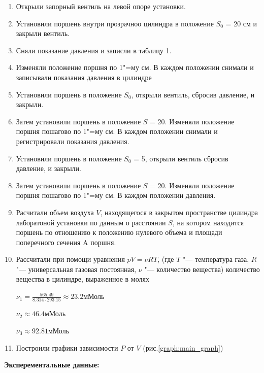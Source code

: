 \begin{enumerate}
    \item{Открыли запорный вентиль на левой опоре установки.}
    \item{Установили поршень внутри прозрачноо цилиндра в положение \texttt{$S_0$} = 20 см и закрыли вентиль.}
    \item{Сняли показание давления и записли в таблицу 1.}
    \item{Изменяли положение поршня по 1"=му см. В каждом положении снимали и записывали показания давления в цилиндре}
    \item{Установили поршень в положение \texttt{$S_0$}, открыли вентиль, сбросив давление, и закрыли.}
    \item{Затем установили поршень в положение \texttt{$S$} = 20. Изменяли положение поршня пошагово по 1"=му см. В каждом положении снимали и регистрировали показания давления.}
    \item{Установили поршень в положение \texttt{$S_0$} = 5, открыли вентиль сбросив давление, и закрыли.}
    \item{Затем установили поршень в положение \texttt{$S$} = 20. Изменяли положение поршня пошагово по 1"=му см. В каждом положении давления.}
    \item{Расчитали объем воздуха \texttt{$V$}, находящегося в закрытом пространстве цилиндра лаборатоной установки по данным о расстоянии \texttt{$S$}, на котором находится поршень по отношению к положению нулевого объема и площади поперечного сечения A поршня.}
    \item{Рассчитали при помощи уравнения \texttt{$p V = \nu R T$}, (где \texttt{$T$} "--- температура газа, \texttt{$R$} "--- универсальная газовая постоянная, \texttt{$\nu$} "--- количество вещества) количество вещества в цилиндре, выраженное в молях}
    
    $
        \nu_1 = \frac{565.49}{8.314 \cdot 293.15} \approx 23.2 \text{мМоль}
    $
    
    $
        \nu_2 \approx 46.4 \text{мМоль}
    $
    
    $
        \nu_3 \approx 92.81 \text{мМоль}
    $
    \item{Построили графики зависимости $P$ от $V$ (рис.\ref{graph:main_graph})}
\end{enumerate}

\textbf{Эксперементальные данные:}

